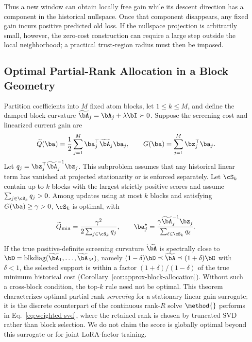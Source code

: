 Thus a new window can obtain locally free gain while its descent direction has
a component in the historical nullspace. Once that component disappears, any
fixed gain incurs positive predicted old loss. If the nullspace projection is
arbitrarily small, however, the zero-cost construction can require a large
step outside the local neighborhood; a practical trust-region radius must then
be imposed.

\subsection{Optimal Partial-Rank Allocation in a Block Geometry}

\begin{theorem}
\label{thm:topk-allocation}
Partition coefficients into $M$ fixed atom blocks, let $1\leq k\leq M$, and
define the damped block curvature
$\widetilde{\bA}_j=\bA_j+\lambda\bI\succ0$. Suppose the screening cost and
linearized current gain are
\begin{equation}
  \widetilde Q(\ba)=\frac12\sum_{j=1}^{M}
  \ba_j^\top\widetilde{\bA}_j\ba_j,
  \qquad
  G(\ba)=\sum_{j=1}^{M}\bz_j^\top\ba_j.
  \label{eq:block-problem}
\end{equation}
Let $q_j=\bz_j^\top\widetilde{\bA}_j^{-1}\bz_j$. This subproblem assumes that any
historical linear term has vanished at projected stationarity or is enforced
separately. Let $\cS_k$ contain up to $k$ blocks with the largest strictly
positive scores and assume $\sum_{j\in\cS_k}q_j>0$. Among updates using at most
$k$ blocks and satisfying $G(\ba)\geq\gamma>0$, $\cS_k$ is optimal, with
\begin{equation}
  \widetilde Q_{\min}=\frac{\gamma^2}{2\sum_{j\in\cS_k}q_j},
  \qquad
  \ba_j^\star=\frac{\gamma\widetilde{\bA}_j^{-1}\bz_j}
  {\sum_{\ell\in\cS_k}q_\ell}.
  \label{eq:topk-solution}
\end{equation}
\end{theorem}

If the true positive-definite screening curvature $\widetilde{\bA}$ is
spectrally close to
$\bD=\operatorname{blkdiag}(\widetilde{\bA}_1,\ldots,
\widetilde{\bA}_M)$, namely
$(1-\delta)\bD\preceq\widetilde{\bA}\preceq
(1+\delta)\bD$ with $\delta<1$, the selected
support is within a factor $(1+\delta)/(1-\delta)$ of the true minimum
historical cost (Corollary~\ref{cor:approx-block-allocation}). Without such a
cross-block condition, the top-$k$ rule need not be optimal. This theorem
characterizes optimal partial-rank \emph{screening} for a stationary linear-gain
surrogate; it is the discrete counterpart of the continuous rank-$R$ solve
$\method{}$ performs in Eq.~\eqref{eq:weighted-svd}, where the retained rank is
chosen by truncated SVD rather than block selection. We do not claim the score is
globally optimal beyond this surrogate or for joint LoRA-factor training.

